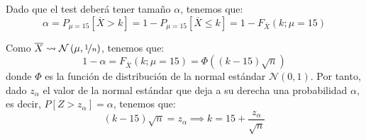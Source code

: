 \begin{ejemplo}
    
    Dado que el test deberá tener tamaño $\alpha$, tenemos que:
    \begin{equation*}
        \alpha = P_{\mu=15}\left[\overline{X} > k\right] = 1 - P_{\mu=15}\left[\overline{X} \leq k\right] = 1 - F_{\overline{X}}(k; \mu=15)
    \end{equation*}

    Como $\overline{X} \rightsquigarrow \mathcal{N}\left(\mu, \nicefrac{1}{n}\right)$, tenemos que:
    \begin{equation*}
        1-\alpha = F_{\overline{X}}(k; \mu=15) = \Phi\left((k - 15)\sqrt{n}\right)
    \end{equation*}
    donde $\Phi$ es la función de distribución de la normal estándar $\mathcal{N}(0,1)$. Por tanto, dado $z_\alpha$ el valor de la normal estándar que deja a su derecha una probabilidad $\alpha$, es decir, $P[Z > z_\alpha] = \alpha$, tenemos que:
    \begin{equation*}
        (k-15)\sqrt{n} = z_\alpha \implies k = 15 + \frac{z_\alpha}{\sqrt{n}}
    \end{equation*}
\end{ejemplo}


